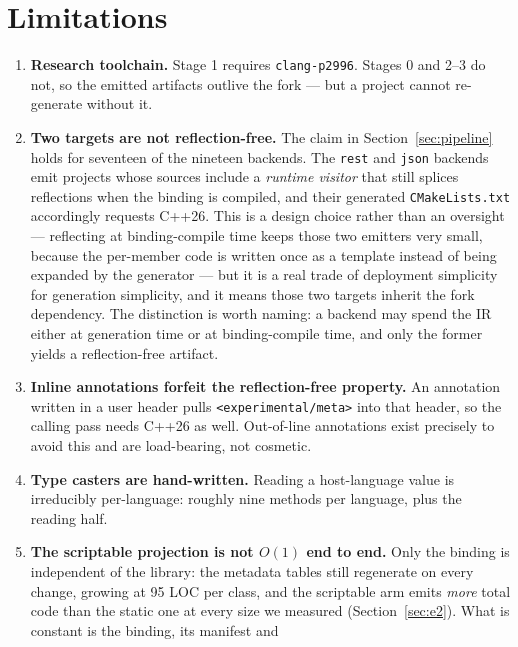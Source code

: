 \documentclass[11pt,a4paper]{article}
\newcommand{\code}[1]{\texttt{\small #1}}
\begin{document}
\section{Limitations}
\label{sec:limitations}

\begin{enumerate}
  \item \textbf{Research toolchain.} Stage 1 requires \code{clang-p2996}. Stages
    0 and 2--3 do not, so the emitted artifacts outlive the fork --- but a
    project cannot re-generate without it.
  \item \textbf{Two targets are not reflection-free.} The claim in
    Section~\ref{sec:pipeline} holds for seventeen of the nineteen backends.
    The \code{rest} and \code{json} backends emit projects whose sources include
    a \emph{runtime visitor} that still splices reflections when the binding is
    compiled, and their generated \code{CMakeLists.txt} accordingly requests
    C++26. This is a design choice rather than an oversight --- reflecting at
    binding-compile time keeps those two emitters very small, because the
    per-member code is written once as a template instead of being expanded by
    the generator --- but it is a real trade of deployment simplicity for
    generation simplicity, and it means those two targets inherit the fork
    dependency. The distinction is worth naming: a backend may spend the IR
    either at generation time or at binding-compile time, and only the former
    yields a reflection-free artifact.
  \item \textbf{Inline annotations forfeit the reflection-free property.} An
    annotation written in a user header pulls \code{<experimental/meta>} into
    that header, so the calling pass needs C++26 as well. Out-of-line
    annotations exist precisely to avoid this and are load-bearing, not
    cosmetic.
  \item \textbf{Type casters are hand-written.} Reading a host-language value is
    irreducibly per-language: roughly nine methods per language, plus the
    reading half.
  \item \textbf{The scriptable projection is not $O(1)$ end to end.} Only the
    binding is independent of the library: the metadata tables still regenerate
    on every change, growing at 95 LOC per class, and the scriptable arm emits
    \emph{more} total code than the static one at every size we measured
    (Section~\ref{sec:e2}). What is constant is the binding, its manifest and

\end{enumerate}
\end{document}
